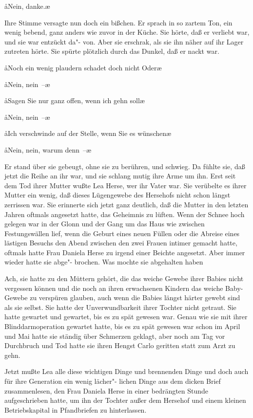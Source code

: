 \aa{}Nein, danke.\ae{}

Ihre Stimme versagte nun doch ein bißchen. Er sprach in so
zartem Ton, ein wenig bebend, ganz anders wie zuvor in der
Küche. Sie hörte, daß er verliebt war, und sie war entzückt da"-%
von. Aber sie erschrak, als sie ihn näher auf ihr Lager zutreten
hörte. Sie spürte plötzlich durch das Dunkel, daß er nackt war.

\aa{}Noch ein wenig plaudern schadet doch nicht\frag{} Oder\frag{}\ae{}

\aa{}Nein, nein~--\ae{}

\aa{}Sagen Sie nur ganz offen, wenn ich gehn soll\frag{}\ae{}

\aa{}Nein, nein~--\ae{}

\aa{}Ich verschwinde auf der Stelle, wenn Sie es wünschen\frag{}\ae{}

\aa{}Nein, nein, warum denn~--\ae{}

Er stand über sie gebeugt, ohne sie zu berühren, und schwieg.
Da fühlte sie, daß jetzt die Reihe an ihr war, und sie schlang
mutig ihre Arme um ihn.
\abstanddrei{}
Erst seit dem Tod ihrer Mutter wußte Lea Herse, wer ihr
Vater war. Sie verübelte es ihrer Mutter ein wenig, daß
dieses Lügengewebe des Hersehofs nicht schon längst zerrissen
war. Sie erinnerte sich jetzt ganz deutlich, daß die Mutter in
den letzten Jahren oftmals angesetzt hatte, das Geheimnis zu
lüften. Wenn der Schnee hoch gelegen war in der Glonn und
der Gang um das Haus wie zwischen Festungswällen lief,
wenn die Geburt eines neuen Füllen oder die Abreise eines
lästigen Besuchs den Abend zwischen den zwei Frauen intimer
gemacht hatte, oftmals hatte Frau Daniela Herse zu irgend
einer Beichte angesetzt. Aber immer wieder hatte sie abge"-%
brochen. Was mochte sie abgehalten haben\frag{}

Ach, sie hatte zu den Müttern gehört, die das weiche Gewebe
ihrer Babies nicht vergessen können und die noch an ihren
erwachsenen Kindern das weiche Baby-Gewebe zu verspüren
glauben, auch wenn die Babies längst härter gewebt sind als
sie selbst. Sie hatte der Unverwundbarkeit ihrer Tochter nicht
getraut. Sie hatte gewartet und gewartet, bis es zu spät
gewesen war. Genau wie sie mit ihrer Blinddarmoperation
gewartet hatte, bis es zu spät gewesen war\dopp{} schon im April
und Mai hatte sie ständig über Schmerzen geklagt, aber noch
am Tag vor Durchbruch und Tod hatte sie ihren Hengst Carlo
geritten statt zum Arzt zu gehn.

Jetzt mußte Lea alle diese wichtigen Dinge und brennenden
Dinge und doch auch für ihre Generation ein wenig lächer"-%
lichen Dinge aus dem dicken Brief zusammenlesen, den Frau
Daniela Herse in einer bedrängten Stunde aufgeschrieben
hatte, um ihn der Tochter außer dem Hersehof und einem
kleinen Betriebskapital in Pfandbriefen zu hinterlassen.

